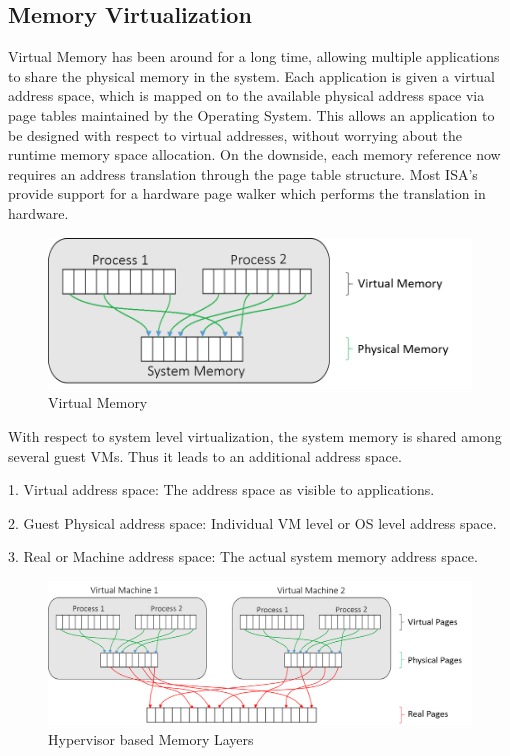 \subsection{Memory Virtualization}
Virtual Memory has been around for a long time, allowing multiple applications to share the physical memory in the system. Each application is given a virtual address space, which is mapped on to the available physical address space via page tables maintained by the Operating System. This allows an application to be designed with respect to virtual addresses, without worrying about the runtime memory space allocation. On the downside, each memory reference now requires an address translation through the page table structure. Most ISA’s provide support for a hardware page walker which performs the translation in hardware. 

\setlength{\belowcaptionskip}{-10pt}

\begin{figure}[H]
  \centering
  \includegraphics[scale=0.8]{figures/virt_mem.png}
  \caption{Virtual Memory}
  \label{fig:virt_mem}
\end{figure}
With respect to system level virtualization, the system memory is shared among several guest VMs. Thus it leads to an additional address space.

1. Virtual address space: The address space as visible to applications.

2. Guest Physical address space: Individual VM level or OS level address space.

3. Real or Machine address space: The actual system memory address space.

\setlength{\belowcaptionskip}{-10pt}

\begin{figure}[H]
  \centering
  \includegraphics[scale=0.65]{figures/hyp_mem_map_comp.png}
  \caption{Hypervisor based Memory Layers}
  \label{fig:hyper_mem}
\end{figure}

